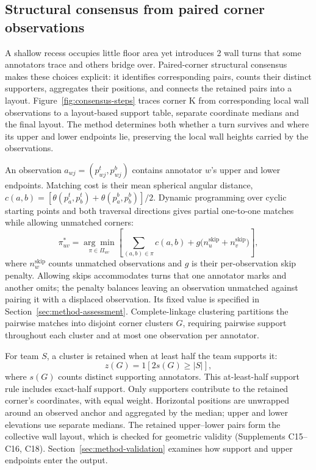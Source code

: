 \subsection{Structural consensus from paired corner observations}
\label{sec:consensus}

A shallow recess occupies little floor area yet introduces 2 wall turns that some annotators trace and others bridge over. Paired-corner structural consensus makes these choices explicit: it identifies corresponding pairs, counts their distinct supporters, aggregates their positions, and connects the retained pairs into a layout. Figure~\ref{fig:consensus-steps} traces corner K from corresponding local wall observations to a layout-based support table, separate coordinate medians and the final layout. The method determines both whether a turn survives and where its upper and lower endpoints lie, preserving the local wall heights carried by the observations.



An observation $a_{wj}=(p^t_{wj},p^b_{wj})$ contains annotator $w$'s upper and lower endpoints. Matching cost is their mean spherical angular distance, $c(a,b)=[\theta(p_a^t,p_b^t)+\theta(p_a^b,p_b^b)]/2$. Dynamic programming over cyclic starting points and both traversal directions gives partial one-to-one matches while allowing unmatched corners:
\begin{equation}
 \pi_{uv}^{*}=\underset{\pi\in\Pi_{uv}}{\arg\min}
 \left[\sum_{(a,b)\in\pi}c(a,b)
 +g\bigl(n_u^{\mathrm{skip}}+n_v^{\mathrm{skip}}\bigr)\right],
 \label{eq:cyclic-match}
\end{equation}
where $n_w^{\mathrm{skip}}$ counts unmatched observations and $g$ is their per-observation skip penalty. Allowing skips accommodates turns that one annotator marks and another omits; the penalty balances leaving an observation unmatched against pairing it with a displaced observation. Its fixed value is specified in Section~\ref{sec:method-assessment}. Complete-linkage clustering partitions the pairwise matches into disjoint corner clusters $G$, requiring pairwise support throughout each cluster and at most one observation per annotator.

For team $S$, a cluster is retained when at least half the team supports it:
\begin{equation}
 z(G)=\mathrm{1}[2s(G)\geq |S|],
 \label{eq:mv50}
\end{equation}
where $s(G)$ counts distinct supporting annotators. This at-least-half support rule includes exact-half support. Only supporters contribute to the retained corner's coordinates, with equal weight. Horizontal positions are unwrapped around an observed anchor and aggregated by the median; upper and lower elevations use separate medians. The retained upper--lower pairs form the collective wall layout, which is checked for geometric validity (Supplements C15--C16, C18). Section~\ref{sec:method-validation} examines how support and upper endpoints enter the output.
